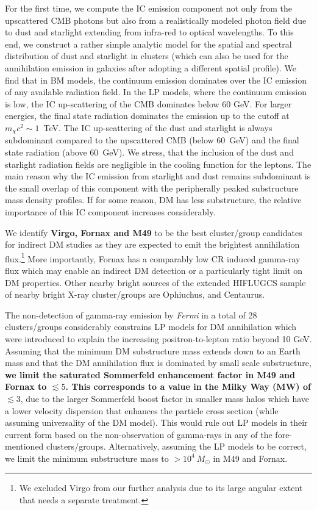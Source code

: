 \documentclass[10pt,aps,pra,reprint,amsmath,amsfonts,amssymb,showpacs,nofootinbib,floatfix]{revtex4-1}
\def\C#1{{\bf #1}}
\newcommand{\Fermi}{{\em Fermi}\xspace}
\newcommand{\msun}{M_\odot}
\begin{document}
For the first time, we compute the IC emission component not only from
the upscattered CMB photons but also from a realistically modeled
photon field due to dust and starlight extending from infra-red to
optical wavelengths. To this end, we construct a rather simple
analytic model for the spatial and spectral distribution of dust and
starlight in clusters (which can also be used for the annihilation
emission in galaxies after adopting a different spatial profile). We
find that in BM models, the continuum emission dominates over the IC
emission of any available radiation field. In the LP models, where the
continuum emission is low, the IC up-scattering of the CMB dominates
below 60 GeV. For larger energies, the final state radiation dominates
the emission up to the cutoff at $m_\chi c^2 \sim 1$~TeV. The IC
up-scattering of the dust and starlight is always subdominant compared
to the upscattered CMB (below 60~GeV) and the final state radiation
(above 60~GeV). We stress, that the inclusion of the dust and
starlight radiation fields are negligible in the cooling function for
the leptons. The main reason why the IC emission from starlight and
dust remains subdominant is the small overlap of this component with
the peripherally peaked substructure mass density profiles. If for
some reason, DM has less substructure, the relative importance of this
IC component increases considerably.

We identify \C{Virgo, Fornax and M49} to be the best cluster/group
candidates for indirect DM studies as they are expected to emit the
brightest annihilation flux.\footnote{We excluded Virgo from our
  further analysis due to its large angular extent that needs a
  separate treatment.} More importantly, Fornax has a comparably low
CR induced gamma-ray flux which may enable an indirect DM detection or
a particularly tight limit on DM properties. Other nearby bright
sources of the extended HIFLUGCS sample of nearby bright X-ray
cluster/groups are Ophiuchus, and Centaurus.

The non-detection of gamma-ray emission by \Fermi in a total of 28
clusters/groups considerably constrains LP models for DM annihilation
which were introduced to explain the increasing positron-to-lepton
ratio beyond 10 GeV. Assuming that the minimum DM substructure mass
extends down to an Earth mass and that the DM annihilation flux is
dominated by small scale substructure, \C{we limit the saturated
Sommerfeld enhancement factor in M49 and Fornax to $\lesssim 5$. This
corresponds to a value in the Milky Way (MW) of $\lesssim3$}, due to
the larger Sommerfeld boost factor in smaller mass halos which have a
lower velocity dispersion that enhances the particle cross section
(while assuming universality of the DM model). This would rule out LP
models in their current form based on the non-observation of
gamma-rays in any of the fore-mentioned
clusters/groups. Alternatively, assuming the LP models to be correct,
we limit the minimum substructure mass to $>10^4~\msun$ in M49 and
Fornax.
\end{document}
